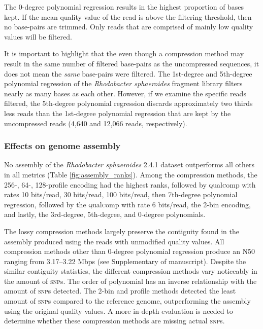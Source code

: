 \documentclass[12pt,\mydriver]{thesis}
\begin{document}
The 0-degree polynomial regression results in the highest proportion
of bases kept. If the mean quality value of the read is above
the filtering threshold, then no base-pairs are trimmed. Only
reads that are comprised of mainly low quality values will be
filtered.

It is important to highlight that the even though a compression method
may result in the same number of filtered base-pairs as the
uncompressed sequences, it does not mean the \emph{same} base-pairs
were filtered. The 1st-degree and 5th-degree polynomial regression of
the \textit{Rhodobacter sphaeroides} fragment library filters nearly
as many bases as each other. However, if we examine the specific
reads filtered, the 5th-degree polynomial regression discards
approximately two thirds less reads than the 1st-degree polynomial
regression that are kept by the uncompressed reads (4,640 and
12,066 reads, respectively).

\subsubsection{Effects on genome assembly}

No assembly of the \textit{Rhodobacter sphaeroides} 2.4.1 dataset
outperforms all others in all metrics (Table
\ref{fig:assembly_ranks}).
Among the compression methods, the 256-, 64-, 128-profile encoding had
the highest ranks, followed by \textsc{q}ual\textsc{c}omp with rates 10 bits/read, 30
bits/read, 100 bits/read, then 7th-degree polynomial regression,
followed by the \textsc{q}ual\textsc{c}omp with rate 6 bits/read, the 2-bin encoding,
and lastly, the 3rd-degree, 5th-degree, and 0-degree polynomials.

The lossy compression methods largely preserve the contiguity found in
the assembly produced using the reads with unmodified quality
values. All compression methods other than 0-degree polynomial
regression produce an N50 ranging from 3.17--3.22 Mbps (see
Supplementary of manuscript). Despite the similar contiguity statistics,
the different compression methods vary noticeably in the amount of
\textsc{snp}s. The order of polynomial has an inverse relationship
with the amount of \textsc{snp}s detected. The 2-bin and profile
methods detected the least amount of \textsc{snp}s compared to the
reference genome, outperforming the assembly using the original
quality values. A more in-depth evaluation is needed to determine
whether these compression methods are missing actual \textsc{snp}s.
\end{document}
